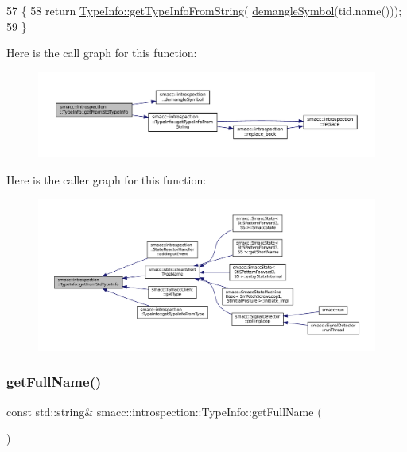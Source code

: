 \begin{DoxyCode}
57 \{
58     \textcolor{keywordflow}{return} \hyperlink{classsmacc_1_1introspection_1_1TypeInfo_a47d65b6c61499d7ae8ab9f6325c84837}{TypeInfo::getTypeInfoFromString}(
      \hyperlink{namespacesmacc_1_1introspection_a2f495108db3e57604d8d3ff5ef030302}{demangleSymbol}(tid.name()));
59 \}
\end{DoxyCode}
Here is the call graph for this function\+:
\nopagebreak
\begin{figure}[H]
\begin{center}
\leavevmode
\includegraphics[width=350pt]{classsmacc_1_1introspection_1_1TypeInfo_ada1e604cd8bf968a5f816fbace4af881_cgraph}
\end{center}
\end{figure}
Here is the caller graph for this function\+:
\nopagebreak
\begin{figure}[H]
\begin{center}
\leavevmode
\includegraphics[width=350pt]{classsmacc_1_1introspection_1_1TypeInfo_ada1e604cd8bf968a5f816fbace4af881_icgraph}
\end{center}
\end{figure}
\mbox{\label{classsmacc_1_1introspection_1_1TypeInfo_ad00815e2537a11be93c9a80846f4dc3a}} 
\subsubsection{\texorpdfstring{get\+Full\+Name()}{getFullName()}}
{\footnotesize\ttfamily const std\+::string\& smacc\+::introspection\+::\+Type\+Info\+::get\+Full\+Name (\begin{DoxyParamCaption}{ }\end{DoxyParamCaption})\hspace{0.3cm}{\ttfamily [inline]}}



